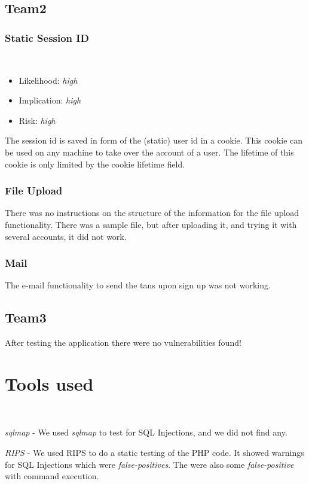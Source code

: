 \documentclass[headsepline,footsepline,footinclude=false,oneside,fontsize=11pt,paper=a4,listof=totoc,bibliography=totoc]{scrbook} %
\begin{document}
\section{Team2}

\subsection{Static Session ID} \
\begin{itemize}
	\item Likelihood: \textit{high}
	\item Implication: \textit{high}
	\item Risk: \textit{high} 
\end{itemize}

The session id is saved in form of the (static) user id in a cookie. This cookie can be used on any machine
to take over the account of a user. The lifetime of this cookie is only limited by the cookie lifetime field.

\subsection{File Upload} 
There was no instructions on the structure of the information for the file upload functionality. There was a sample file, but after uploading it, and trying it with several accounts, it did not work.

\subsection{Mail}
The e-mail functionality to send the tans upon sign up was not working.


\section{Team3}

After testing the application there were no vulnerabilities found!

 

\chapter{Tools used}
\

\textit{sqlmap} - We used \textit{sqlmap} to test for SQL Injections, and we did not find any.\

\textit{RIPS} - We used RIPS to do a static testing of the PHP code. It showed warnings for SQL Injections which were \textit{false-positives}. The were also some \textit{false-positive} with command execution.\
\end{document}

